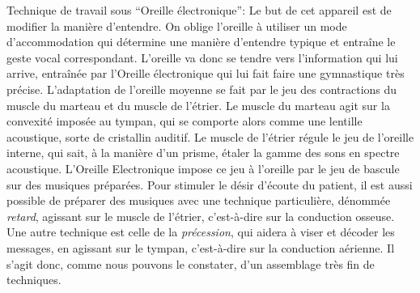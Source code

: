 Technique de travail sous ``Oreille électronique'':
Le but de cet appareil
est de modifier la manière d'entendre. On oblige l'oreille à utiliser
un mode d'accommodation qui
détermine une manière d'entendre typique et entraîne le geste
vocal correspondant.
L'oreille va donc se tendre
vers l'information qui lui arrive, entraînée par l'Oreille
électronique qui lui fait faire une
gymnastique très précise.
L'adaptation de l'oreille moyenne se fait par le jeu des contractions
du muscle du marteau et du muscle de l'étrier.
 Le muscle du marteau agit sur la convexité imposée au tympan, qui
se comporte alors comme une lentille acoustique, sorte de cristallin
auditif.
Le muscle de l'étrier régule le jeu de l'oreille interne, qui sait,
à la manière d'un prisme, étaler la gamme des sons en spectre acoustique.
L'Oreille Electronique impose ce jeu à l'oreille par le jeu de
bascule sur des musiques préparées.
Pour stimuler le désir d'écoute
du patient, il est aussi possible de préparer des musiques avec une
technique particulière, dénommée \emph{retard}, agissant sur le muscle de
l'étrier, c'est-à-dire sur la conduction osseuse. Une autre technique
est celle de la \emph{précession}, qui aidera à viser et décoder les messages,
en agissant sur le tympan, c'est-à-dire sur la conduction aérienne.
Il s'agit donc, comme nous pouvons le constater, d'un assemblage très
fin de techniques.

